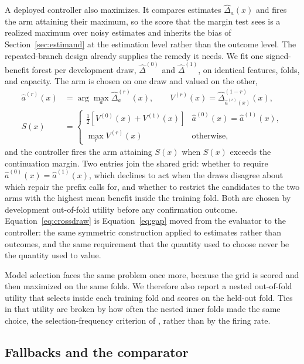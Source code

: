 A deployed controller also maximizes. It compares estimates $\widehat\Delta_a(x)$ and fires the arm attaining their maximum, so the score that the margin test sees is a realized maximum over noisy estimates and inherits the bias of Section~\ref{sec:estimand} at the estimation level rather than the outcome level. The repeated-branch design already supplies the remedy it needs. We fit one signed-benefit forest per development draw, $\widehat\Delta^{(0)}$ and $\widehat\Delta^{(1)}$, on identical features, folds, and capacity. The arm is chosen on one draw and valued on the other,
\begin{equation}
\begin{aligned}
\widehat a^{(r)}(x)&=\arg\max_a\widehat\Delta^{(r)}_a(x),
\qquad V^{(r)}(x)=\widehat\Delta^{(1-r)}_{\widehat a^{(r)}(x)}(x),
\\
S(x)&=\begin{cases}\tfrac12\left[V^{(0)}(x)+V^{(1)}(x)\right] & \widehat a^{(0)}(x)=\widehat a^{(1)}(x),\\[2pt] \max_r V^{(r)}(x) & \text{otherwise,}\end{cases}
\end{aligned}
\label{eq:crossdraw}
\end{equation}
and the controller fires the arm attaining $S(x)$ when $S(x)$ exceeds the continuation margin. Two entries join the shared grid: whether to require $\widehat a^{(0)}(x)=\widehat a^{(1)}(x)$, which declines to act when the draws disagree about which repair the prefix calls for, and whether to restrict the candidates to the two arms with the highest mean benefit inside the training fold. Both are chosen by development out-of-fold utility before any confirmation outcome. Equation~\ref{eq:crossdraw} is Equation~\ref{eq:gap} moved from the evaluator to the controller: the same symmetric construction applied to estimates rather than outcomes, and the same requirement that the quantity used to choose never be the quantity used to value.

Model selection faces the same problem once more, because the grid is scored and then maximized on the same folds. We therefore also report a nested out-of-fold utility that selects inside each training fold and scores on the held-out fold. Ties in that utility are broken by how often the nested inner folds made the same choice, the selection-frequency criterion of \citet{meinshausen2010stability}, rather than by the firing rate.

\subsection{Fallbacks and the comparator}

